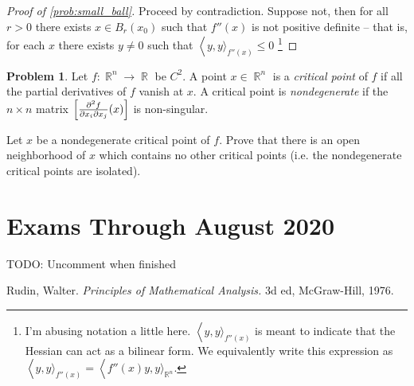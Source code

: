 \documentclass[english]{article}
\DeclareMathOperator{\R}{\mathbb{R}}
\DeclareMathOperator{\<}{\langle}
\renewcommand{\>}{\rangle}
\theoremstyle{definition}
\newtheorem{problem}[theorem]{Problem}
\begin{document}
\begin{proof}[Proof of \cref{prob:small_ball}]
    Proceed by contradiction. Suppose not, then for all $r > 0$ there exists $x \in B_r(x_0)$ such that $f''(x)$ is not positive definite -- that is, for each $x$ there exists $y \neq 0$ such that $\< y, y \>_{f''(x)} \leq 0$ \footnote{I'm abusing notation a little here. $\< y, y \>_{f''(x)}$ is meant to indicate that the Hessian can act as a bilinear form. We equivalently write this expression as $\< y, y \>_{f''(x)} = \<f''(x)y, y \>_{\R^n}$.}
\end{proof}

\begin{problem}
    Let $f: \R^n \to \R$ be $C^2$. A point $x \in \R^n$ is a \textit{critical point} of $f$ if all the partial derivatives of $f$ vanish at $x$. A critical point is \textit{nondegenerate} if the $n \times n$ matrix $\left[ {\partial^2 f \over \partial x_i \partial x_j } (x) \right]$ is non-singular. 

    Let $x$ be a nondegenerate critical point of $f$. Prove that there is an open neighborhood of $x$ which contains no other critical points (i.e. the nondegenerate critical points are isolated).
\end{problem}


\pagebreak

\section{Exams Through August 2020}
TODO: Uncomment when finished
% 

\pagebreak

\begin{thebibliography}{9}
    Rudin, Walter. \textit{Principles of Mathematical Analysis.} 3d ed, McGraw-Hill, 1976.
\end{thebibliography}
\end{document}
